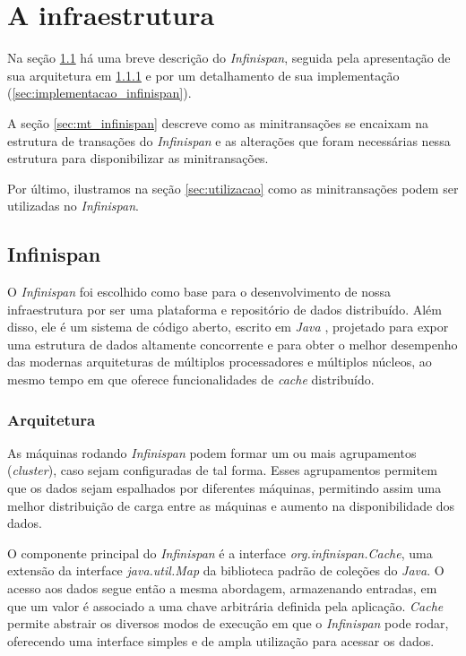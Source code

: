 \documentclass[11pt,twoside,a4paper]{book}
\begin{document}
\chapter{A infraestrutura}
\label{chap:implementacao}
Na seção \ref{sec:infinispan} há uma breve descrição do \emph{Infinispan}, seguida pela apresentação de sua arquitetura em \ref{sec:arquitetura_infinispan} e por um detalhamento de sua implementação (\ref{sec:implementacao_infinispan}). 

A seção \ref{sec:mt_infinispan} descreve como as minitransações se
encaixam na estrutura de transações do \emph{Infinispan} e as alterações que
foram necessárias nessa estrutura para disponibilizar as minitransações.

Por último, ilustramos na seção \ref{sec:utilizacao} como as minitransações
podem ser utilizadas no \emph{Infinispan}.

\section{Infinispan}
\label{sec:infinispan}
O \emph{Infinispan} foi escolhido como base para o desenvolvimento de nossa
infraestrutura por ser uma plataforma e repositório de dados distribuído. Além
disso, ele é um sistema de código aberto, escrito em \emph{Java} \cite{java},
projetado para expor uma estrutura de dados altamente concorrente e para obter o
melhor desempenho das modernas arquiteturas de múltiplos processadores e
múltiplos núcleos, ao mesmo tempo em que oferece funcionalidades de \emph{cache}
distribuído.

\subsection{Arquitetura}
\label{sec:arquitetura_infinispan}
As máquinas rodando \emph{Infinispan} podem formar um ou mais agrupamentos (\emph{cluster}),
caso sejam configuradas de tal forma. Esses agrupamentos permitem que os dados sejam espalhados 
por diferentes máquinas, permitindo assim uma melhor distribuição de carga entre as máquinas e
aumento na disponibilidade dos dados.

O componente principal do \emph{Infinispan} é a interface \emph{org.infinispan.Cache}, uma extensão 
da interface \emph{java.util.Map} da biblioteca padrão de coleções do \emph{Java}. 
O acesso aos dados segue então a mesma abordagem, armazenando entradas, em que um valor é associado a uma 
chave arbitrária definida pela aplicação. \emph{Cache} permite abstrair os diversos 
modos de execução em que o \emph{Infinispan} pode rodar, oferecendo uma interface 
simples e de ampla utilização para acessar os dados.
\end{document}
